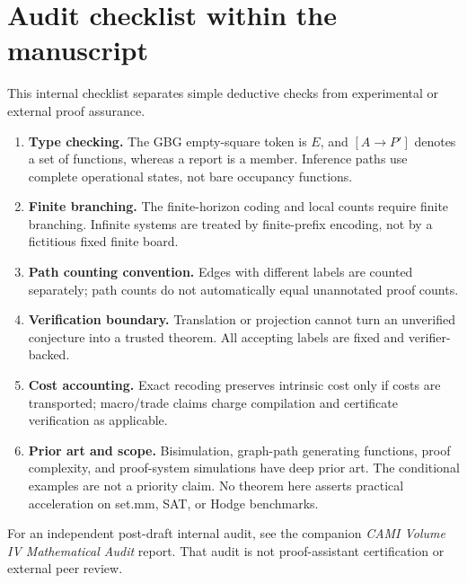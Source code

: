 \documentclass[11pt,letterpaper]{article}
\theoremstyle{definition}
\begin{document}
\section{Audit checklist within the manuscript}
This internal checklist separates simple deductive checks from experimental or external proof assurance.
\begin{enumerate}[leftmargin=*]
\item \textbf{Type checking.} The GBG empty-square token is $E$, and $[A\to P']$ denotes a set of functions, whereas a report is a member. Inference paths use complete operational states, not bare occupancy functions.
\item \textbf{Finite branching.} The finite-horizon coding and local counts require finite branching. Infinite systems are treated by finite-prefix encoding, not by a fictitious fixed finite board.
\item \textbf{Path counting convention.} Edges with different labels are counted separately; path counts do not automatically equal unannotated proof counts.
\item \textbf{Verification boundary.} Translation or projection cannot turn an unverified conjecture into a trusted theorem. All accepting labels are fixed and verifier-backed.
\item \textbf{Cost accounting.} Exact recoding preserves intrinsic cost only if costs are transported; macro/trade claims charge compilation and certificate verification as applicable.
\item \textbf{Prior art and scope.} Bisimulation, graph-path generating functions, proof complexity, and proof-system simulations have deep prior art. The conditional examples are not a priority claim. No theorem here asserts practical acceleration on set.mm, SAT, or Hodge benchmarks.
\end{enumerate}
For an independent post-draft internal audit, see the companion \emph{CAMI Volume IV Mathematical Audit} report. That audit is not proof-assistant certification or external peer review.
\end{document}
